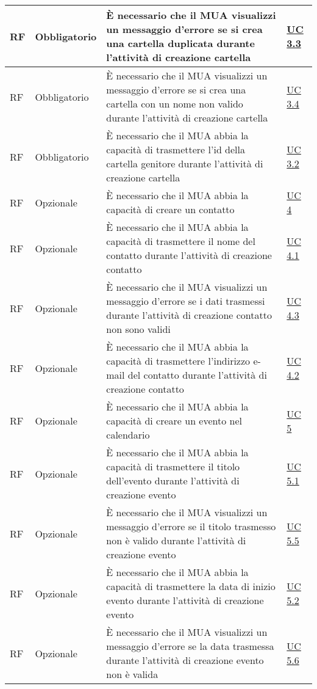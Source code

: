 \begin{longtable}{*{1}{>{\centering\arraybackslash}p{1.5cm}}*{1}{>{\centering\arraybackslash}p{2.5cm}}p{6cm}*{1}{>{\centering\arraybackslash}p{3cm}}}
    \\\hline
    RF & Obbligatorio & È necessario che il MUA visualizzi un messaggio d'errore se si crea una cartella duplicata durante l'attività di creazione cartella& \hyperref[sec:UC3.3]{UC 3.3}
    \\\hline
    RF & Obbligatorio & È necessario che il MUA visualizzi un messaggio d'errore se si crea una cartella con un nome non valido durante l'attività di creazione cartella & \hyperref[sec:UC3.4]{UC 3.4}
    \\\hline
    RF & Obbligatorio & È necessario che il MUA abbia la capacità di trasmettere l'id della cartella genitore durante l'attività di creazione cartella & \hyperref[sec:UC3.2]{UC 3.2}
    \\\hline
    RF & Opzionale & È necessario che il MUA abbia la capacità di creare un contatto & \hyperref[sec:UC4]{UC 4}
    \\\hline
    RF & Opzionale & È necessario che il MUA abbia la capacità di trasmettere il nome del contatto durante l'attività di creazione contatto & \hyperref[sec:UC4.1]{UC 4.1}
    \\\hline
    RF & Opzionale & È necessario che il MUA visualizzi un messaggio d'errore se i dati trasmessi durante l'attività di creazione contatto non sono validi & \hyperref[sec:UC4.3]{UC 4.3}
    \\\hline
    RF & Opzionale & È necessario che il MUA abbia la capacità di trasmettere l'indirizzo e-mail del contatto durante l'attività di creazione contatto & \hyperref[sec:UC4.2]{UC 4.2}
    \\\hline
    RF & Opzionale & È necessario che il MUA abbia la capacità di creare un evento nel calendario & \hyperref[sec:UC5]{UC 5}
    \\\hline
    RF & Opzionale & È necessario che il MUA abbia la capacità di trasmettere il titolo dell'evento durante l'attività di creazione evento & \hyperref[sec:UC5.1]{UC 5.1}
    \\\hline
    RF & Opzionale & È necessario che il MUA visualizzi un messaggio d'errore se il titolo trasmesso non è valido durante l'attività di creazione evento & \hyperref[sec:UC5.5]{UC 5.5}
    \\\hline
    RF & Opzionale & È necessario che il MUA abbia la capacità di trasmettere la data di inizio evento durante l'attività di creazione evento & \hyperref[sec:UC5.2]{UC 5.2}
    \\\hline
    RF & Opzionale & È necessario che il MUA visualizzi un messaggio d'errore se la data trasmessa durante l'attività di creazione evento non è valida & \hyperref[sec:UC5.6]{UC 5.6}

\end{longtable}
